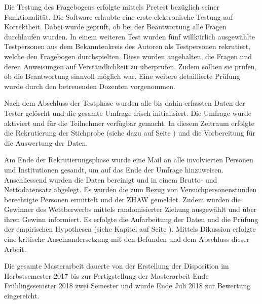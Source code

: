 Die Testung des Fragebogens erfolgte mittels Pretest bezüglich seiner Funktionalität. Die Software erlaubte eine erste elektronische Testung auf Korrektheit. Dabei wurde geprüft, ob bei der Beantwortung alle Fragen durchlaufen wurden. In einem weiteren Test wurden fünf willkürlich ausgewählte Testpersonen aus dem Bekanntenkreis des Autoren als Testpersonen rekrutiert, welche den Fragebogen durchspielten. Diese wurden angehalten, die Fragen und deren Anweisungen auf Verständlichkeit zu überprüfen. Zudem sollten sie prüfen, ob die Beantwortung sinnvoll möglich war. Eine weitere detaillierte Prüfung wurde durch den betreuenden Dozenten vorgenommen. 

Nach dem Abschluss der Testphase wurden alle bis dahin erfassten Daten der Tester gelöscht und die gesamte Umfrage frisch initialisiert. Die Umfrage wurde aktiviert und für die Teilnehmer verfügbar gemacht. In diesem Zeitraum erfolgte die Rekrutierung der Stichprobe (siehe dazu \textit{} auf Seite \pageref{sec:Datenerhebung}) und die Vorbereitung für die Auswertung der Daten. 

Am Ende der Rekrutierungsphase wurde eine Mail an alle involvierten Personen und Institutionen gesandt, um auf das Ende der Umfrage hinzuweisen. Anschliessend wurden die Daten bereinigt und in einem Brutto- und Nettodatensatz abgelegt. Es wurden die zum Bezug von Versuchpersonenstunden berechtigte Personen ermittelt und der ZHAW gemeldet. Zudem wurden die Gewinner des Wettberwerbs mittels randomisierter Ziehung ausgewählt und über ihren Gewinn informiert. Es erfolgte die Aufarbeitung der Daten und die Prüfung der empirischen Hypothesen (siehe Kapitel \textit{} auf Seite \pageref{sec:EmpirischeHypothesen}). Mittels Dikussion erfolgte eine kritische Auseinandersetzung mit den Befunden und dem Abschluss dieser Arbeit.

Die gesamte Masterarbeit dauerte von der Erstellung der Disposition im Herbstsemester 2017 bis zur Fertigstellung der Masterarbeit Ende Frühlingssemster 2018 zwei Semester und wurde Ende Juli 2018 zur Bewertung eingereicht.

